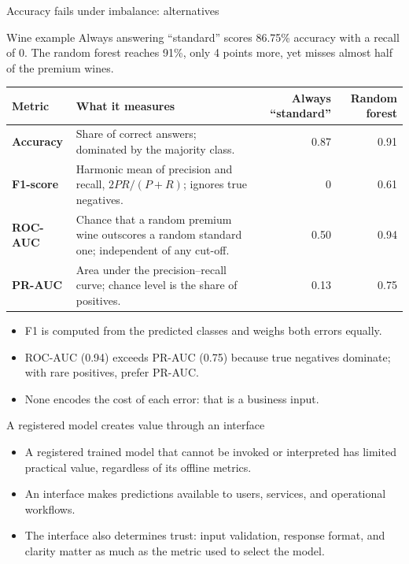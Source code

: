 \begin{frame}{Accuracy fails under imbalance: alternatives}
\begin{block}{Wine example}
\footnotesize Always answering ``standard'' scores 86.75\% accuracy with a recall of 0. The random forest reaches 91\%, only 4 points more, yet misses almost half of the premium wines.
\end{block}
\begingroup\footnotesize
\begin{tabularx}{\textwidth}{>{\bfseries}l >{\raggedright\arraybackslash}X r r}
Metric & What it measures & Always ``standard'' & Random forest \\
\toprule
Accuracy & Share of correct answers; dominated by the majority class. & 0.87 & 0.91 \\
F1-score & Harmonic mean of precision and recall, $2PR/(P+R)$; ignores true negatives. & 0 & 0.61 \\
ROC-AUC & Chance that a random premium wine outscores a random standard one; independent of any cut-off. & 0.50 & 0.94 \\
PR-AUC & Area under the precision--recall curve; chance level is the share of positives. & 0.13 & 0.75 \\
\bottomrule
\end{tabularx}
\par\endgroup
\vspace{0.3em}
\begin{itemize}\footnotesize
\item F1 is computed from the predicted classes and weighs both errors equally.
\item ROC-AUC (0.94) exceeds PR-AUC (0.75) because true negatives dominate; with rare positives, prefer PR-AUC.
\item None encodes the cost of each error: that is a business input.
\end{itemize}
\coursefooter
\end{frame}


\begin{frame}{A registered model creates value through an interface}
\begin{itemize}
\item A registered trained model that cannot be invoked or interpreted has limited practical value, regardless of its offline metrics.
\item An interface makes predictions available to users, services, and operational workflows.
\item The interface also determines trust: input validation, response format, and clarity matter as much as the metric used to select the model.
\end{itemize}
\coursefooter
\end{frame}

